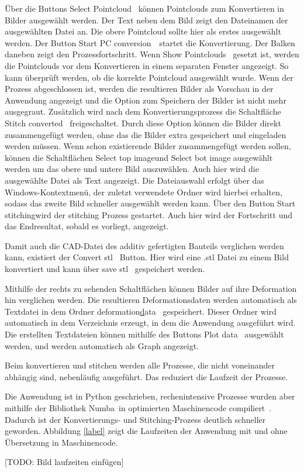 Über die Buttons \glqq Select Pointcloud\grqq~ können Pointclouds zum Konvertieren in Bilder
ausgewählt werden. Der Text neben dem Bild zeigt den Dateinamen der ausgewählten 
Datei an. Die obere Pointcloud sollte hier als erstes ausgewählt werden.
Der Button \glqq Start PC conversion\grqq~~startet die Konvertierung. Der Balken 
daneben zeigt den Prozessfortschritt. 
Wenn \glqq Show Pointclouds\grqq~ gesetzt ist, werden die Pointclouds vor dem 
Konvertieren in einem separaten Fenster angezeigt. So kann überprüft werden, ob die 
korrekte Pointcloud ausgewählt wurde.
Wenn der Prozess abgeschlossen ist, werden die resultieren Bilder als Vorschau in der 
Anwendung angezeigt und die Option zum Speichern der Bilder ist nicht mehr ausgegraut.
Zusätzlich wird nach dem Konvertierungsprozess die Schaltfläche 
\glqq Stitch converted\grqq~ freigeschaltet. Durch diese Option können die 
Bilder direkt zusammengefügt werden, ohne das die Bilder extra gespeichert und 
eingeladen werden müssen. Wenn schon existierende Bilder zusammengefügt werden sollen, 
können die Schaltflächen \glqq Select top image\grqq und \glqq Select bot image\grqq
ausgewählt werden um das obere und untere Bild auszuwählen. Auch hier wird die 
ausgewählte Datei als Text angezeigt. Die Dateiauswahl erfolgt über das 
Windows-Kontextmenü, der zuletzt verwendete Ordner wird hierbei erhalten, sodass das 
zweite Bild schneller ausgewählt werden kann. 
Über den Button \glqq Start stitching\grqq wird der stitching Prozess gestartet. 
Auch hier wird der Fortschritt und das Endresultat, sobald es vorliegt, angezeigt.

Damit auch die CAD-Datei des additiv gefertigten Bauteils verglichen werden kann, 
existiert der \glqq Convert stl\grqq~ Button. Hier wird eine .stl Datei zu einem Bild 
konvertiert und kann über \glqq save stl\grqq~ gespeichert werden.

Mithilfe der rechts zu sehenden Schaltflächen können Bilder auf ihre Deformation hin 
verglichen werden. Die resultieren Deformationsdaten werden automatisch als Textdatei
in dem Ordner \glqq deformation\underline data\grqq~ gespeichert. Dieser Ordner wird automatisch 
in dem Verzeichnis erzeugt, in dem die Anwendung ausgeführt wird. 
Die erstellten Textdateien können mithilfe des Buttons \glqq Plot data\grqq~ ausgewählt 
werden, und werden automatisch als Graph angezeigt. 

Beim konvertieren und stitchen werden alle Prozesse, die nicht voneinander abhängig sind,  
nebenläufig ausgeführt. Das reduziert die Laufzeit der Prozesse.

Die Anwendung ist in Python geschrieben, rechenintensive Prozesse wurden aber mithilfe 
der Bibliothek \glqq Numba\grqq~in optimierten Maschinencode compiliert~\cite{numba}.
Dadurch ist der Konvertierungs- und Stitching-Prozess deutlich schneller geworden. 
Abbildung \ref{label} zeigt die Laufzeiten der Anwendung mit und ohne Übersetzung in 
Maschinencode.

[TODO: Bild laufzeiten einfügen]



